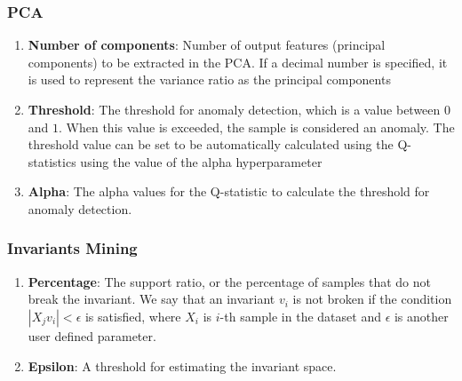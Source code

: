 \subsubsection*{PCA}
\begin{enumerate} 
\item \textbf{Number of components}: Number of output features (principal components) to be extracted in the PCA. If a decimal number is specified, it is used to represent the variance ratio as the principal components 
\item \textbf{Threshold}: The threshold for anomaly detection, which is a value between $0$ and $1$. When this value is exceeded, the sample is considered an anomaly. The threshold value can be set to be automatically calculated using the Q-statistics using the value of the alpha hyperparameter 
\item \textbf{Alpha}: The alpha values for the Q-statistic to calculate the threshold for anomaly detection. 
\end{enumerate}

\subsubsection*{Invariants Mining}
\begin{enumerate}
    \item \textbf{Percentage}: The support ratio, or the percentage of samples that do not break the invariant. We say that an invariant $v_i$ is not broken if the condition $|X_j v_i| < \epsilon $ is satisfied, where $X_i$ is $i$-th sample in the dataset and $\epsilon$ is another user defined parameter. 
    \item \textbf{Epsilon}: A threshold for estimating the invariant space.
\end{enumerate}

